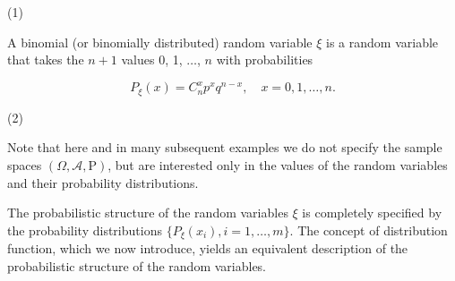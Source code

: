(1)

A binomial (or binomially distributed) random variable $\xi$ is a random variable that takes the $n + 1$ values 0, 1, $\ldots$, $n$ with probabilities

$$P_{\xi}(x) = C_n^x p^x q^{n-x}, \quad x = 0, 1, \ldots, n.$$  

(2)

Note that here and in many subsequent examples we do not specify the sample spaces $(\Omega, \mathcal{A}, \text{P})$, but are interested only in the values of the random variables and their probability distributions.

The probabilistic structure of the random variables $\xi$ is completely specified by the probability distributions $\{P_{\xi}(x_i), i = 1, \ldots, m\}$. The concept of distribution function, which we now introduce, yields an equivalent description of the probabilistic structure of the random variables.
